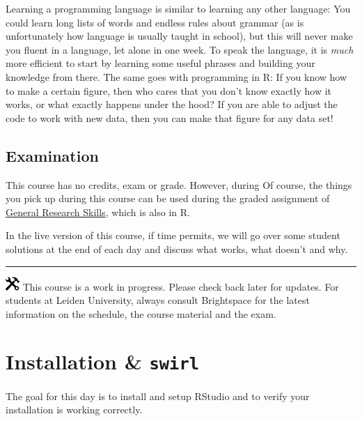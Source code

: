 \documentclass[
]{book}
\begin{document}
Learning a programming language is similar to learning any other language: You could learn long lists of words and endless rules about grammar (as is unfortunately how language is usually taught in school), but this will never make you fluent in a language, let alone in one week. To speak the language, it is \emph{much} more efficient to start by learning some useful phrases and building your knowledge from there. The same goes with programming in R: If you know how to make a certain figure, then who cares that you don't know exactly how it works, or what exactly happens under the hood? If you are able to adjust the code to work with new data, then you can make that figure for any data set!

\hypertarget{examination}{%
\section*{Examination}\label{examination}}

This course has no credits, exam or grade. However, during Of course, the things you pick up during this course can be used during the graded assignment of \href{https://fransrodenburg.github.io/General-Research-Skills/}{General Research Skills}, which is also in R.

In the live version of this course, if time permits, we will go over some student solutions at the end of each day and discuss what works, what doesn't and why.

\begin{center}\rule{0.5\linewidth}{0.5pt}\end{center}

\includegraphics[width=0.20833in,height=0.20833in]{figures/underconstruction.png} This course is a work in progress. Please check back later for updates. For students at Leiden University, always consult Brightspace for the latest information on the schedule, the course material and the exam.

\hypertarget{installation}{%
\chapter{\texorpdfstring{Installation \& \texttt{swirl}}{Installation \& swirl}}\label{installation}}

The goal for this day is to install and setup RStudio and to verify your installation is working correctly.
\end{document}
